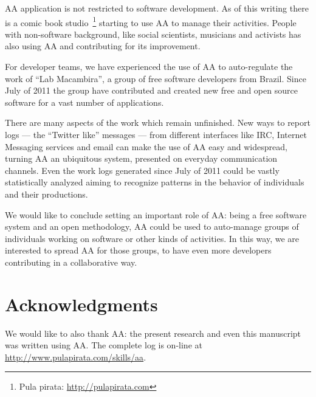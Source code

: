 \documentclass[letterpaper]{article}
\begin{document}
AA application is not restricted to software development. As of this writing
there is a comic book studio~\footnote{Pula pirata: \url{http://pulapirata.com}}
starting to use AA to manage their activities. People with non-software
background, like social scientists, musicians and activists has also using AA
and contributing for its improvement.

For developer teams, we have experienced the use of AA to auto-regulate the work
of ``Lab Macambira'', a group of free software developers from Brazil. Since
July of 2011 the group have contributed and created new free and open source
software for a vast number of applications.

There are many aspects of the work which remain unfinished. New ways to report
logs --- the ``Twitter like'' messages --- from different interfaces like IRC,
Internet Messaging services and email can make the use of AA easy and
widespread, turning AA an ubiquitous system, presented on everyday communication
channels. Even the work logs generated since July of 2011 could be vastly
statistically analyzed aiming to recognize patterns in the behavior of
individuals and their productions.

We would like to conclude setting an important role of AA: being a free software
system and an open methodology, AA could be used to auto-manage groups of
individuals working on software or other kinds of activities. In this way, we
are interested to spread AA for those groups, to have even more developers
contributing in a collaborative way.

\section*{Acknowledgments}

We would like to also thank AA: the present research and even this manuscript
was written using AA. The complete log is on-line at
\url{http://www.pulapirata.com/skills/aa}.


\nocite{last2003}
\nocite{german2003}
\nocite{carmel1999}
\nocite{carmel2001}
\nocite{komi2005}
\nocite{battin2001}

%
%


\end{document}
